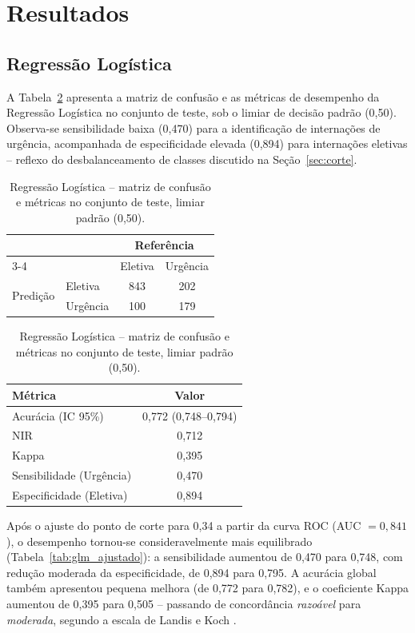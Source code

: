 \documentclass[12pt,a4paper]{article}
\begin{document}
\section{Resultados}
\label{sec:resultados}

\subsection{Regressão Logística}

A Tabela~\ref{tab:glm_default} apresenta a matriz de confusão e as métricas de desempenho da Regressão Logística no conjunto de teste, sob o limiar de decisão padrão (0,50). Observa-se sensibilidade baixa (0,470) para a identificação de internações de urgência, acompanhada de especificidade elevada (0,894) para internações eletivas -- reflexo do desbalanceamento de classes discutido na Seção~\ref{sec:corte}.

\begin{table}[H]
\centering
\caption{Regressão Logística -- matriz de confusão e métricas no conjunto de teste, limiar padrão (0,50).}
\label{tab:glm_default}
\begin{tabular}{llcc}
\toprule
& & \multicolumn{2}{c}{Referência} \\
\cmidrule(lr){3-4}
& & Eletiva & Urgência \\
\midrule
\multirow{2}{*}{Predição} & Eletiva & 843 & 202 \\
& Urgência & 100 & 179 \\
\bottomrule
\end{tabular}
\hspace{1.2cm}
\begin{tabular}{lc}
\toprule
Métrica & Valor \\
\midrule
Acurácia (IC 95\%) & 0,772 (0,748--0,794) \\
NIR & 0,712 \\
Kappa & 0,395 \\
Sensibilidade (Urgência) & 0,470 \\
Especificidade (Eletiva) & 0,894 \\
\bottomrule
\end{tabular}
\end{table}

Após o ajuste do ponto de corte para 0,34 a partir da curva ROC (AUC $=0,841$), o desempenho tornou-se consideravelmente mais equilibrado (Tabela~\ref{tab:glm_ajustado}): a sensibilidade aumentou de 0,470 para 0,748, com redução moderada da especificidade, de 0,894 para 0,795. A acurácia global também apresentou pequena melhora (de 0,772 para 0,782), e o coeficiente Kappa aumentou de 0,395 para 0,505 -- passando de concordância \emph{razoável} para \emph{moderada}, segundo a escala de Landis e Koch \cite{landis1977}.
\end{document}
